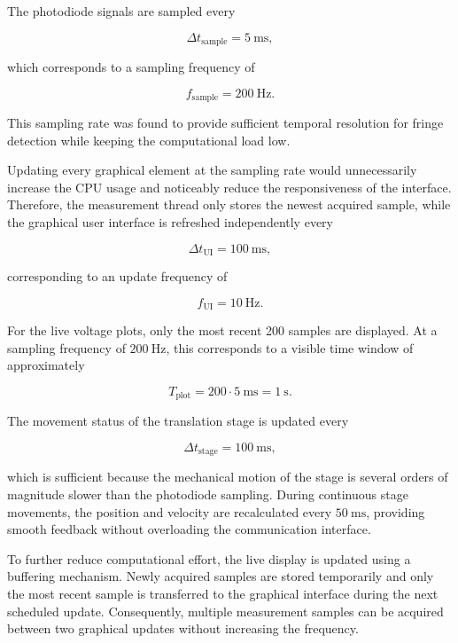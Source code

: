 The photodiode signals are sampled every

\begin{equation}
\Delta t_{\mathrm{sample}} = 5~\mathrm{ms},
\end{equation}

which corresponds to a sampling frequency of

\begin{equation}
f_{\mathrm{sample}} = 200~\mathrm{Hz}.
\end{equation}

This sampling rate was found to provide sufficient temporal resolution for fringe detection while keeping the computational load low.

Updating every graphical element at the sampling rate would unnecessarily increase the CPU usage and noticeably reduce the responsiveness of the interface. Therefore, the measurement thread only stores the newest acquired sample, while the graphical user interface is refreshed independently every

\begin{equation}
\Delta t_{\mathrm{UI}} = 100~\mathrm{ms},
\end{equation}

corresponding to an update frequency of

\begin{equation}
f_{\mathrm{UI}} = 10~\mathrm{Hz}.
\end{equation}


For the live voltage plots, only the most recent 200 samples are displayed. At a sampling frequency of \(200~\mathrm{Hz}\), this corresponds to a visible time window of approximately

\begin{equation}
T_{\mathrm{plot}}
=
200 \cdot 5~\mathrm{ms}
=
1~\mathrm{s}.
\end{equation}

The movement status of the translation stage is updated every

\begin{equation}
\Delta t_{\mathrm{stage}} = 100~\mathrm{ms},
\end{equation}

which is sufficient because the mechanical motion of the stage is several orders of magnitude slower than the photodiode sampling. During continuous stage movements, the position and velocity are recalculated every \(50~\mathrm{ms}\), providing smooth feedback without overloading the communication interface.

To further reduce computational effort, the live display is updated using a buffering mechanism. Newly acquired samples are stored temporarily and only the most recent sample is transferred to the graphical interface during the next scheduled update. Consequently, multiple measurement samples can be acquired between two graphical updates without increasing the frequency.
